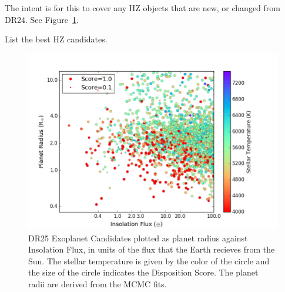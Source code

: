 \label{s:hz}
The intent is for this to cover any HZ objects that are new, or changed from DR24. See Figure~\ref{f:hzPlot}.

List the best HZ candidates.

\begin{figure}
    \centering
    \includegraphics[width=1.1\linewidth]{fig-CatalogRadiusInsolScore.png}
    \caption{DR25 Exoplanet Candidates plotted as planet radius against Insolation Flux, in units of the flux that the Earth recieves from the Sun. The stellar temperature is given by the color of the circle and the size of the circle indicates the Disposition Score. The planet radii are derived from the MCMC fits. }
    \label{f:hzPlot}
\end{figure}